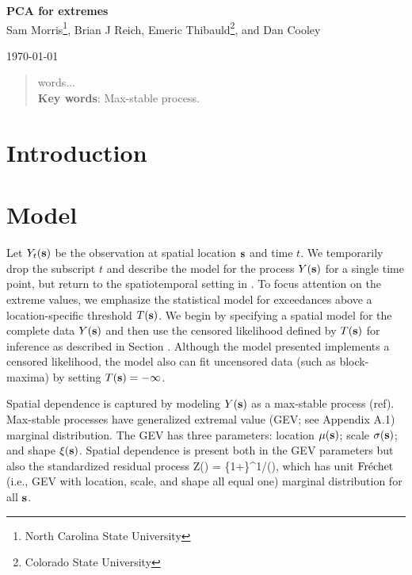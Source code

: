 \documentclass[11pt]{article}
\begin{document}
\linenumbers
\pagestyle{empty}
\begin{center}
{\Large {\bf PCA for extremes}}\\

{\large Sam Morris\footnote[1]{North Carolina State University}, Brian J Reich\footnotemark[1]{}, Emeric Thibauld\footnote[2]{Colorado State University}, and Dan Cooley\footnotemark[2]{}}

\today
\end{center}


\begin{abstract}
	words...\\
	{\bf Key words}: Max-stable process.

\end{abstract}
\newpage
\pagestyle{plain}
\setcounter{page}{1}

\section{Introduction}\label{ebs:intro}

\section{Model}\label{ebs:model}

Let $Y_{t}(\mbox{\bf s})$ be the observation at spatial location $\mbox{\bf s}$ and time $t$.  We temporarily drop the subscript $t$ and describe the model for the process $Y(\mbox{\bf s})$ for a single time point, but return to the spatiotemporal setting in .
To focus attention on the extreme values, we emphasize the statistical model for exceedances above a location-specific threshold $T(\mbox{\bf s})$.
We begin by specifying a spatial model for the complete data $Y(\mbox{\bf s})$ and then use the censored likelihood defined by $T(\mbox{\bf s})$ for inference as described in Section .
Although the model presented implements a censored likelihood, the model also can fit uncensored data (such as block-maxima) by setting $T(\mbox{\bf s}) = -\infty$.

Spatial dependence is captured by modeling $Y(\mbox{\bf s})$ as a max-stable process (ref).
Max-stable processes have generalized extremal value (GEV; see Appendix A.1) marginal distribution.
The GEV has three parameters: location $\mu(\mbox{\bf s})$; scale $\sigma(\mbox{\bf s})$; and shape $\xi(\mbox{\bf s})$.
Spatial dependence is present both in the GEV parameters but also the standardized residual process
\beq\label{ebeq:Y2Z}
 Z(\bs) = \left\{1+\frac{\xi(\bs)}{\sigma(\bs)}\left[Y(\bs) - \mu(\bs)\right]\right\}^{1/\xi(\bs)},
\eeq which has unit $\mbox{Fr$\acute{\mbox{e}}$chet }$ (i.e., GEV with location, scale, and shape all equal one) marginal distribution for all $\mbox{\bf s}$.
\end{document}
